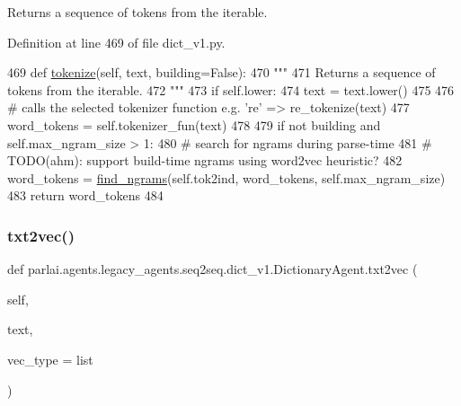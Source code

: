 \begin{DoxyVerb}Returns a sequence of tokens from the iterable.
\end{DoxyVerb}
 

Definition at line 469 of file dict\+\_\+v1.\+py.


\begin{DoxyCode}
469     \textcolor{keyword}{def }\hyperlink{namespaceparlai_1_1agents_1_1tfidf__retriever_1_1build__tfidf_a1fdb457e98eb4e4c26047e229686a616}{tokenize}(self, text, building=False):
470         \textcolor{stringliteral}{"""}
471 \textcolor{stringliteral}{        Returns a sequence of tokens from the iterable.}
472 \textcolor{stringliteral}{        """}
473         \textcolor{keywordflow}{if} self.lower:
474             text = text.lower()
475 
476         \textcolor{comment}{# calls the selected tokenizer function e.g. 're' => re\_tokenize(text)}
477         word\_tokens = self.tokenizer\_fun(text)
478 
479         \textcolor{keywordflow}{if} \textcolor{keywordflow}{not} building \textcolor{keywordflow}{and} self.max\_ngram\_size > 1:
480             \textcolor{comment}{# search for ngrams during parse-time}
481             \textcolor{comment}{# TODO(ahm): support build-time ngrams using word2vec heuristic?}
482             word\_tokens = \hyperlink{namespaceparlai_1_1agents_1_1legacy__agents_1_1seq2seq_1_1dict__v1_ac37e7654855b4cdf9b8a6cb1a2193a17}{find\_ngrams}(self.tok2ind, word\_tokens, self.max\_ngram\_size)
483         \textcolor{keywordflow}{return} word\_tokens
484 
\end{DoxyCode}
\mbox{\label{classparlai_1_1agents_1_1legacy__agents_1_1seq2seq_1_1dict__v1_1_1DictionaryAgent_a8419b546a12830d98e1eb14615744294}} 
\subsubsection{\texorpdfstring{txt2vec()}{txt2vec()}}
{\footnotesize\ttfamily def parlai.\+agents.\+legacy\+\_\+agents.\+seq2seq.\+dict\+\_\+v1.\+Dictionary\+Agent.\+txt2vec (\begin{DoxyParamCaption}\item[{}]{self,  }\item[{}]{text,  }\item[{}]{vec\+\_\+type = {\ttfamily list} }\end{DoxyParamCaption})}

